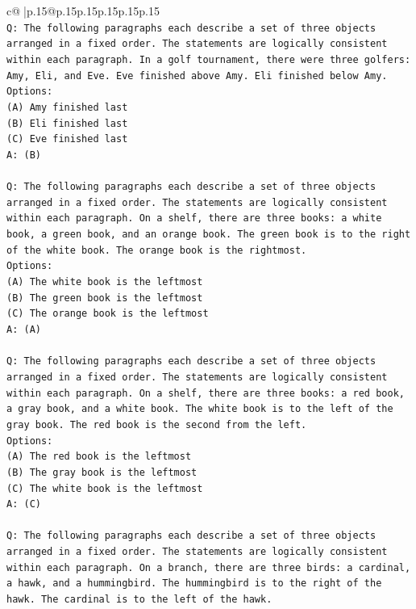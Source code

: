 \documentclass{article}
\begin{document}
{\begin{supertabular}{c@{$\;$}|p{.15\linewidth}@{}p{.15\linewidth}p{.15\linewidth}p{.15\linewidth}p{.15\linewidth}p{.15\linewidth}}
{{{\\ 
\texttt{Q: The following paragraphs each describe a set of three objects arranged in a fixed order. The statements are logically consistent within each paragraph. In a golf tournament, there were three golfers: Amy, Eli, and Eve. Eve finished above Amy. Eli finished below Amy.} \\
\texttt{Options:} \\
\texttt{(A) Amy finished last} \\
\texttt{(B) Eli finished last} \\
\texttt{(C) Eve finished last} \\
\texttt{A: (B)} \\
\\ 
\texttt{Q: The following paragraphs each describe a set of three objects arranged in a fixed order. The statements are logically consistent within each paragraph. On a shelf, there are three books: a white book, a green book, and an orange book. The green book is to the right of the white book. The orange book is the rightmost.} \\
\texttt{Options:} \\
\texttt{(A) The white book is the leftmost} \\
\texttt{(B) The green book is the leftmost} \\
\texttt{(C) The orange book is the leftmost} \\
\texttt{A: (A)} \\
\\ 
\texttt{Q: The following paragraphs each describe a set of three objects arranged in a fixed order. The statements are logically consistent within each paragraph. On a shelf, there are three books: a red book, a gray book, and a white book. The white book is to the left of the gray book. The red book is the second from the left.} \\
\texttt{Options:} \\
\texttt{(A) The red book is the leftmost} \\
\texttt{(B) The gray book is the leftmost} \\
\texttt{(C) The white book is the leftmost} \\
\texttt{A: (C)} \\
\\ 
\texttt{Q: The following paragraphs each describe a set of three objects arranged in a fixed order. The statements are logically consistent within each paragraph. On a branch, there are three birds: a cardinal, a hawk, and a hummingbird. The hummingbird is to the right of the hawk. The cardinal is to the left of the hawk.} \\
}}}
\end{supertabular}}
\end{document}
